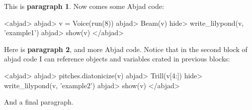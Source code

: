 \documentclass[11pt]{article}
\begin{document}
This is \textbf{paragraph 1}.
Now comes some Abjad code:

<abjad>
   abjad> v = Voice(run(8))
   abjad> Beam(v)
   hide> write_lilypond(v, 'example1')
   abjad> show(v)
</abjad>

Here is \textbf{paragraph 2}, and more Abjad code. Notice that in the second block of abjad code I can reference objects and variables crated in previous blocks:

<abjad>
   abjad> pitches.diatonicize(v)
   abjad> Trill(v[4:])
   hide> write_lilypond(v, 'example2')
   abjad> show(v)
</abjad>

And a final paragraph.
\end{document}
